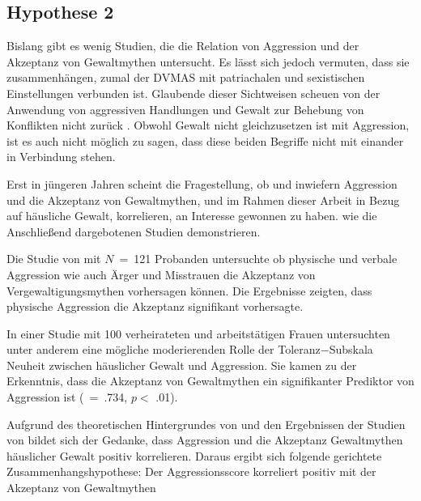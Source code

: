 \subsection{Hypothese 2}    \label{subsec_2.2.2}
Bislang gibt es wenig Studien, die die Relation von Aggression und der Akzeptanz von Gewaltmythen untersucht. Es lässt sich jedoch vermuten, dass sie zusammenhängen, zumal der DVMAS mit patriachalen und sexistischen Einstellungen verbunden ist. Glaubende dieser Sichtweisen scheuen von der Anwendung von aggressiven Handlungen und Gewalt zur Behebung von Konflikten nicht zurück \textcite{DVMAS_Peters}. Obwohl Gewalt nicht gleichzusetzen ist mit Aggression, ist es auch nicht möglich zu sagen, dass diese beiden Begriffe nicht mit einander in Verbindung stehen.

Erst in jüngeren Jahren scheint die Fragestellung, ob und inwiefern Aggression und die Akzeptanz von Gewaltmythen, und im Rahmen dieser Arbeit in Bezug auf häusliche Gewalt, korrelieren, an Interesse gewonnen zu haben. wie die Anschließend dargebotenen Studien demonstrieren.

Die Studie von \textcite{H2_u_3_Bhogal_2016} mit $N$~=~121 Probanden untersuchte ob physische und verbale Aggression wie auch Ärger und Misstrauen die Akzeptanz von Vergewaltigungsmythen vorhersagen können. Die Ergebnisse zeigten, dass physische Aggression die Akzeptanz signifikant vorhersagte.

In einer Studie mit 100 verheirateten und arbeitstätigen Frauen untersuchten \textcite{H1_moderation_2020} unter anderem eine mögliche moderierenden Rolle der Toleranz$-$Subskala Neuheit zwischen häuslicher Gewalt und Aggression. Sie kamen zu der Erkenntnis, dass die Akzeptanz von Gewaltmythen ein signifikanter Prediktor von Aggression ist (\textbeta~=~.734, $p<$ .01).

Aufgrund des theoretischen Hintergrundes von \textcite{DVMAS_Peters} und den Ergebnissen der Studien von \textcite{H1_moderation_2020, H2_u_3_Bhogal_2016} bildet sich der Gedanke, dass Aggression und die Akzeptanz Gewaltmythen häuslicher Gewalt positiv korrelieren. Daraus ergibt sich folgende gerichtete Zusammenhangshypothese: Der Aggressionsscore korreliert positiv mit der Akzeptanz von Gewaltmythen


